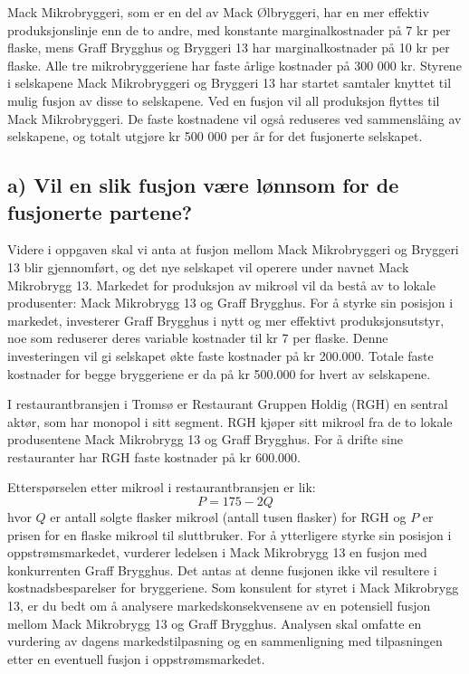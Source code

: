 \documentclass[
  12pt,
  a4paper,
  DIV=11,
  numbers=noendperiod]{scrartcl}
\begin{document}
Mack Mikrobryggeri, som er en del av Mack Ølbryggeri, har en mer
effektiv produksjonslinje enn de to andre, med konstante
marginalkostnader på 7 kr per flaske, mens Graff Brygghus og Bryggeri 13
har marginalkostnader på 10 kr per flaske. Alle tre mikrobryggeriene har
faste årlige kostnader på 300 000 kr. Styrene i selskapene Mack
Mikrobryggeri og Bryggeri 13 har startet samtaler knyttet til mulig
fusjon av disse to selskapene. Ved en fusjon vil all produksjon flyttes
til Mack Mikrobryggeri. De faste kostnadene vil også reduseres ved
sammenslåing av selskapene, og totalt utgjøre kr 500 000 per år for det
fusjonerte selskapet.

\subsection{a) Vil en slik fusjon være lønnsom for de fusjonerte
partene?}\label{a-vil-en-slik-fusjon-vuxe6re-luxf8nnsom-for-de-fusjonerte-partene}

Videre i oppgaven skal vi anta at fusjon mellom Mack Mikrobryggeri og
Bryggeri 13 blir gjennomført, og det nye selskapet vil operere under
navnet Mack Mikrobrygg 13. Markedet for produksjon av mikroøl vil da
bestå av to lokale produsenter: Mack Mikrobrygg 13 og Graff Brygghus.
For å styrke sin posisjon i markedet, investerer Graff Brygghus i nytt
og mer effektivt produksjonsutstyr, noe som reduserer deres variable
kostnader til kr 7 per flaske. Denne investeringen vil gi selskapet økte
faste kostnader på kr 200.000. Totale faste kostnader for begge
bryggeriene er da på kr 500.000 for hvert av selskapene.

I restaurantbransjen i Tromsø er Restaurant Gruppen Holdig (RGH) en
sentral aktør, som har monopol i sitt segment. RGH kjøper sitt mikroøl
fra de to lokale produsentene Mack Mikrobrygg 13 og Graff Brygghus. For
å drifte sine restauranter har RGH faste kostnader på kr 600.000.

Etterspørselen etter mikroøl i restaurantbransjen er lik: \[
P = 175 - 2Q
\] hvor \(Q\) er antall solgte flasker mikroøl (antall tusen flasker)
for RGH og \(P\) er prisen for en flaske mikroøl til sluttbruker. For å
ytterligere styrke sin posisjon i oppstrømsmarkedet, vurderer ledelsen i
Mack Mikrobrygg 13 en fusjon med konkurrenten Graff Brygghus. Det antas
at denne fusjonen ikke vil resultere i kostnadsbesparelser for
bryggeriene. Som konsulent for styret i Mack Mikrobrygg 13, er du bedt
om å analysere markedskonsekvensene av en potensiell fusjon mellom Mack
Mikrobrygg 13 og Graff Brygghus. Analysen skal omfatte en vurdering av
dagens markedstilpasning og en sammenligning med tilpasningen etter en
eventuell fusjon i oppstrømsmarkedet.
\end{document}
